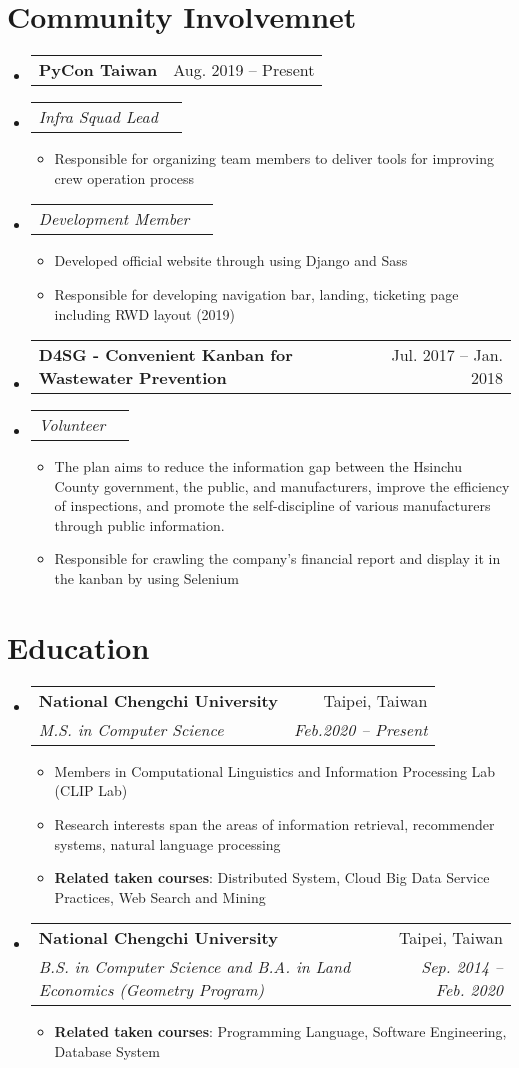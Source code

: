 \documentclass[letterpaper,11pt]{article}
\makeatletter
\newcommand{\resumeItem}[1]{
  \item\small{
    {#1 \vspace{-2pt}}
  }
}
\newcommand{\resumeSubheading}[4]{
  \vspace{-2pt}\item
    \begin{tabular*}{0.97\textwidth}[t]{l@{\extracolsep{\fill}}r}
      \textbf{#1} & #2 \\
      \textit{\small#3} & \textit{\small #4} \\
    \end{tabular*}\vspace{-7pt}
}
\newcommand{\resumeSubSubheading}[2]{
    \item
    \begin{tabular*}{0.97\textwidth}{l@{\extracolsep{\fill}}r}
      \textit{\small#1} & \textit{\small #2} \\
    \end{tabular*}\vspace{-7pt}
}
\newcommand{\resumeProjectHeading}[2]{
    \item
    \begin{tabular*}{0.97\textwidth}{l@{\extracolsep{\fill}}r}
      \small#1 & #2 \\
    \end{tabular*}\vspace{-7pt}
}
\newcommand{\resumeSubHeadingListStart}{\begin{itemize}[leftmargin=0.15in, label={}]}
\newcommand{\resumeSubHeadingListEnd}{\end{itemize}}
\newcommand{\resumeItemListStart}{\begin{itemize}}
\newcommand{\resumeItemListEnd}{\end{itemize}\vspace{-5pt}}
\makeatother
\begin{document}
\section{Community Involvemnet}
    \resumeSubHeadingListStart
        \resumeProjectHeading{\large{\textbf{PyCon Taiwan}}}{Aug. 2019 -- Present}
        \resumeSubSubheading
         {Infra Squad Lead}{}
          \resumeItemListStart
            \resumeItem{Responsible for organizing team members to deliver tools for improving crew operation process}
          \resumeItemListEnd
        \resumeSubSubheading
         {Development Member}{}
          \resumeItemListStart
            \resumeItem{Developed official website through using Django and Sass}
            \resumeItem{Responsible for developing navigation bar, landing, ticketing page including RWD layout (2019)}
          \resumeItemListEnd
        \resumeProjectHeading{\large{\textbf{D4SG - Convenient Kanban for Wastewater Prevention}}}{Jul. 2017 -- Jan. 2018}
        \resumeSubSubheading
         {Volunteer}{}
          \resumeItemListStart
            \resumeItem{The plan aims to reduce the information gap between the Hsinchu County government, the public, and manufacturers, improve the efficiency of inspections, and promote the self-discipline of various manufacturers through public information.}
            \resumeItem{Responsible for crawling the company's financial report and display it in the kanban by using Selenium}
          \resumeItemListEnd
    \resumeSubHeadingListEnd

\section{Education}
  \resumeSubHeadingListStart
    \resumeSubheading
      {National Chengchi University}{Taipei, Taiwan}
      {M.S. in Computer Science}{Feb.2020 -- Present}
    \resumeItemListStart
        \resumeItem{Members in Computational Linguistics and Information Processing Lab (CLIP Lab)}
        \resumeItem{Research interests span the areas of information retrieval, recommender systems, natural language processing}
        \resumeItem{\textbf{Related taken courses}:
        Distributed System, Cloud Big Data Service Practices, Web Search and Mining}
    \resumeItemListEnd
    \resumeSubheading
      {National Chengchi University}{Taipei, Taiwan}
      {B.S. in Computer Science and B.A. in Land Economics (Geometry Program)}{Sep. 2014 -- Feb. 2020}
    \resumeItemListStart
        \resumeItem{\textbf{Related taken courses}:
        Programming Language, Software Engineering, Database System}
    \resumeItemListEnd
  \resumeSubHeadingListEnd
\end{document}
